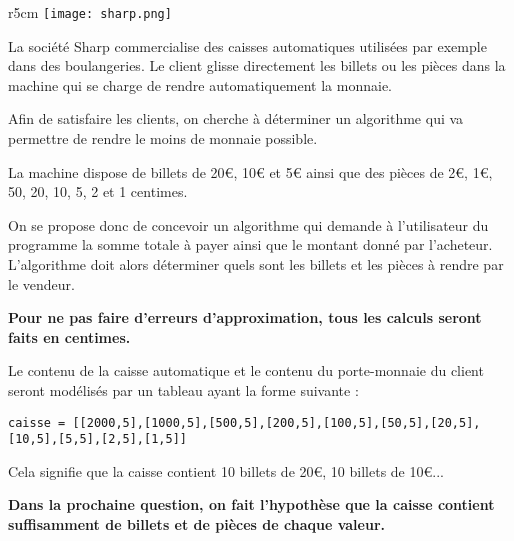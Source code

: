 \setcounter{numques}{0}

\begin{wrapfigure}{r}{5cm}
\centering
\texttt{[image: sharp.png]}
\end{wrapfigure} 

La société Sharp commercialise des caisses automatiques utilisées par exemple dans des boulangeries. Le client glisse directement les billets ou les pièces dans la machine qui se charge de rendre automatiquement la monnaie. 
\begin{obj}
Afin de satisfaire les clients, on cherche à déterminer un algorithme qui va permettre de rendre le moins de monnaie possible. 
\end{obj}

La machine dispose de billets de 20\euro{}, 10\euro{} et 5\euro{} ainsi que des pièces de 2\euro{}, 1\euro{}, 50, 20, 10, 5, 2 et 1 centimes. 

\vspace{.5cm}

On se propose donc de concevoir un algorithme qui demande à l'utilisateur du programme la somme totale à payer ainsi que le montant donné par l'acheteur. L'algorithme doit alors déterminer quels sont les billets et les pièces à rendre par le vendeur. 

\textbf{Pour ne pas faire d'erreurs d'approximation, tous les calculs seront faits en centimes.}

Le contenu de la caisse automatique et le contenu du porte-monnaie du client seront modélisés par un tableau ayant la forme suivante : 
\begin{lstlisting}
caisse = [[2000,5],[1000,5],[500,5],[200,5],[100,5],[50,5],[20,5],[10,5],[5,5],[2,5],[1,5]]
\end{lstlisting}
Cela signifie que la caisse contient 10 billets de 20\euro{}, 10 billets de 10\euro{}... 




\textbf{Dans la prochaine question, on fait l'hypothèse que la caisse contient suffisamment de billets et de pièces de chaque valeur.}

